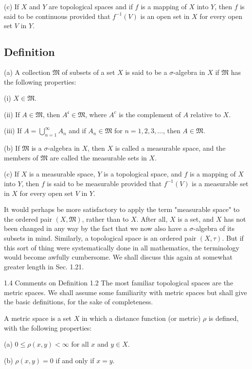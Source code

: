 \documentclass[10pt]{article}
\begin{document}
(c) If $X$ and $Y$ are topological spaces and if $f$ is a mapping of $X$ into $Y$, then $f$ is said to be continuous provided that $f^{-1}(V)$ is an open set in $X$ for every open set $V$ in $Y$.

\subsection{Definition}
(a) A collection $\mathfrak{M}$ of subsets of a set $X$ is said to be a $\sigma$-algebra in $X$ if $\mathfrak{M}$ has the following properties:

(i) $X \in \mathfrak{M}$.

(ii) If $A \in \mathfrak{M}$, then $A^{\mathfrak{c}} \in \mathfrak{M}$, where $A^{c}$ is the complement of $A$ relative to $X$.

(iii) If $A=\bigcup_{n=1}^{\infty} A_{n}$ and if $A_{n} \in \mathfrak{M}$ for $n=1,2,3, \ldots$, then $A \in \mathfrak{M}$.

(b) If $\mathfrak{M}$ is a $\sigma$-algebra in $X$, then $X$ is called a measurable space, and the members of $\mathfrak{M}$ are called the measurable sets in $X$.

(c) If $X$ is a measurable space, $Y$ is a topological space, and $f$ is a mapping of $X$ into $Y$, then $f$ is said to be measurable provided that $f^{-1}(V)$ is a measurable set in $X$ for every open set $V$ in $Y$.

It would perhaps be more satisfactory to apply the term "measurable space" to the ordered pair $(X, \mathfrak{M})$, rather than to $X$. After all, $X$ is a set, and $X$ has not been changed in any way by the fact that we now also have a $\sigma$-algebra of its subsets in mind. Similarly, a topological space is an ordered pair $(X, \tau)$. But if this sort of thing were systematically done in all mathematics, the terminology would become awfully cumbersome. We shall discuss this again at somewhat greater length in Sec. 1.21.

1.4 Comments on Definition 1.2 The most familiar topological spaces are the metric spaces. We shall assume some familiarity with metric spaces but shall give the basic definitions, for the sake of completeness.

A metric space is a set $X$ in which a distance function (or metric) $\rho$ is defined, with the following properties:

(a) $0 \leq \rho(x, y)<\infty$ for all $x$ and $y \in X$.

(b) $\rho(x, y)=0$ if and only if $x=y$.
\end{document}
